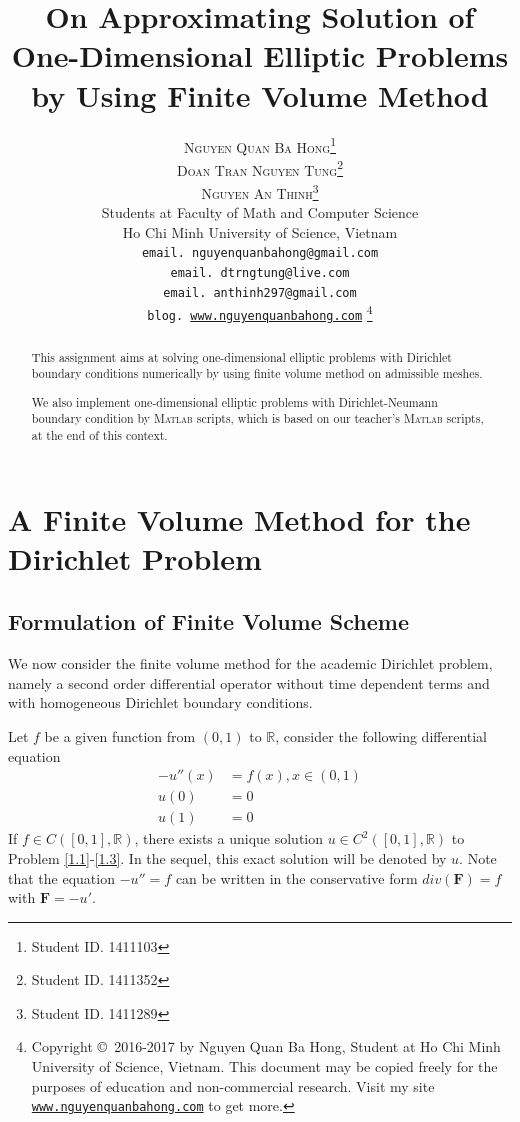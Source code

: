 \documentclass[a4paper]{article}
\title{\huge On Approximating Solution of One-Dimensional Elliptic Problems by Using Finite Volume Method}
\author{\textsc{Nguyen Quan Ba Hong}\footnote{Student ID. 1411103}\\
\textsc{Doan Tran Nguyen Tung}\footnote{Student ID. 1411352}\\
\textsc{Nguyen An Thinh}\footnote{Student ID. 1411289}\\
{\small Students at Faculty of Math and Computer Science}\\ 
{\small Ho Chi Minh University of Science, Vietnam} \\
{\small \texttt{email. nguyenquanbahong@gmail.com}}\\
{\small \texttt{email. dtrngtung@live.com}}\\
{\small \texttt{email. anthinh297@gmail.com}}\\
{\small \texttt{blog. \url{www.nguyenquanbahong.com}} 
\footnote{Copyright \copyright\ 2016-2017 by Nguyen Quan Ba Hong, Student at Ho Chi Minh University of Science, Vietnam. This document may be copied freely for the purposes of education and non-commercial research. Visit my site \texttt{\url{www.nguyenquanbahong.com}} to get more.}}}
\numberwithin{equation}{section}
\begin{document}
\maketitle
\begin{abstract}
This assignment aims at solving one-dimensional elliptic problems with Dirichlet boundary conditions numerically by using finite volume method on admissible meshes. 

We also implement one-dimensional elliptic problems with Dirichlet-Neumann boundary condition by \textsc{Matlab}  scripts, which is based on our teacher's \textsc{Matlab} scripts, at the end of this context.
\end{abstract}
\newpage
\thispagestyle{plain}
\begin{sloppypar}
\par{}
\end{sloppypar}
\newpage
\tableofcontents
\newpage
\listoffigures
\newpage
\listoftables
\newpage
\section{A Finite Volume Method for the Dirichlet Problem}
\subsection{Formulation of Finite Volume Scheme}
We now consider the finite volume method for the academic Dirichlet problem, namely a second order differential operator without time dependent terms and with homogeneous Dirichlet boundary conditions. 

Let $f$ be a given function from $\left(0,1\right)$ to $\mathbb{R}$, consider the following differential equation
\begin{align}
\label{1.1}
 - u''\left( x \right) &= f\left( x \right),x \in \left( {0,1} \right)\\
u\left( 0 \right) &= 0\\
u\left( 1 \right) &= 0 \label{1.3}
\end{align}
If $f \in C\left( {\left[ {0,1} \right],\mathbb{R}} \right)$, there exists a unique solution $u \in {C^2}\left( {\left[ {0,1} \right],\mathbb{R}} \right)$ to Problem \eqref{1.1}-\eqref{1.3}. In the sequel, this exact solution will be denoted by $u$. Note that the equation $-u''=f$ can be written in the conservative form $div\left( \mathbf{F} \right) = f$ with $\mathbf{F}=-u'$.
\end{document}
